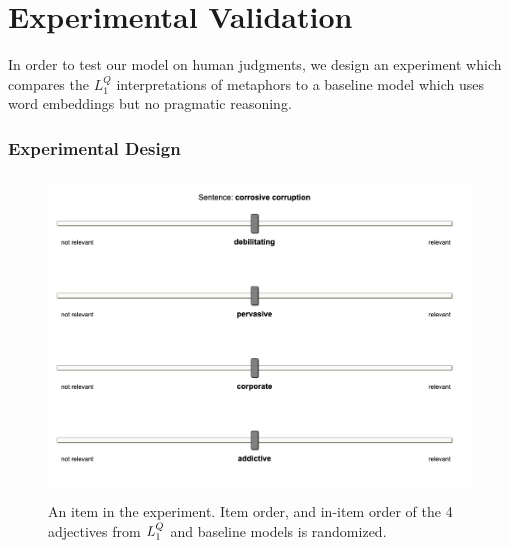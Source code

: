 \documentclass[OpenMind]{stjour}
\newcommand{\Listener}{L}
\newcommand{\QLONE}{\Listener_{{1}}^{{Q}}}
\begin{document}
\section{Experimental Validation} \label{exp}

	In order to test our model on human judgments, we design an experiment which compares the $\QLONE$ interpretations of metaphors to a baseline model which uses word embeddings but no pragmatic reasoning.


	\subsubsection{Experimental Design}

		\begin{figure}
		\includegraphics[height=8.5cm]{images/slide.png}
		\caption{An item in the experiment. Item order, and in-item order of the 4 adjectives from $\protect\QLONE$ and baseline models is randomized.}
		\label{fig:slide}
		\end{figure}
\end{document}
